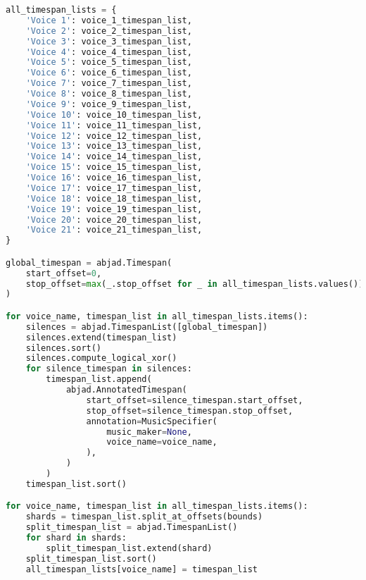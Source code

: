 \begin{lstlisting}[language=Python, caption=Invocation Source Code]
all_timespan_lists = {
    'Voice 1': voice_1_timespan_list,
    'Voice 2': voice_2_timespan_list,
    'Voice 3': voice_3_timespan_list,
    'Voice 4': voice_4_timespan_list,
    'Voice 5': voice_5_timespan_list,
    'Voice 6': voice_6_timespan_list,
    'Voice 7': voice_7_timespan_list,
    'Voice 8': voice_8_timespan_list,
    'Voice 9': voice_9_timespan_list,
    'Voice 10': voice_10_timespan_list,
    'Voice 11': voice_11_timespan_list,
    'Voice 12': voice_12_timespan_list,
    'Voice 13': voice_13_timespan_list,
    'Voice 14': voice_14_timespan_list,
    'Voice 15': voice_15_timespan_list,
    'Voice 16': voice_16_timespan_list,
    'Voice 17': voice_17_timespan_list,
    'Voice 18': voice_18_timespan_list,
    'Voice 19': voice_19_timespan_list,
    'Voice 20': voice_20_timespan_list,
    'Voice 21': voice_21_timespan_list,
}

global_timespan = abjad.Timespan(
    start_offset=0,
    stop_offset=max(_.stop_offset for _ in all_timespan_lists.values())
)

for voice_name, timespan_list in all_timespan_lists.items():
    silences = abjad.TimespanList([global_timespan])
    silences.extend(timespan_list)
    silences.sort()
    silences.compute_logical_xor()
    for silence_timespan in silences:
        timespan_list.append(
            abjad.AnnotatedTimespan(
                start_offset=silence_timespan.start_offset,
                stop_offset=silence_timespan.stop_offset,
                annotation=MusicSpecifier(
                    music_maker=None,
                    voice_name=voice_name,
                ),
            )
        )
    timespan_list.sort()

for voice_name, timespan_list in all_timespan_lists.items():
    shards = timespan_list.split_at_offsets(bounds)
    split_timespan_list = abjad.TimespanList()
    for shard in shards:
        split_timespan_list.extend(shard)
    split_timespan_list.sort()
    all_timespan_lists[voice_name] = timespan_list


\end{lstlisting}
